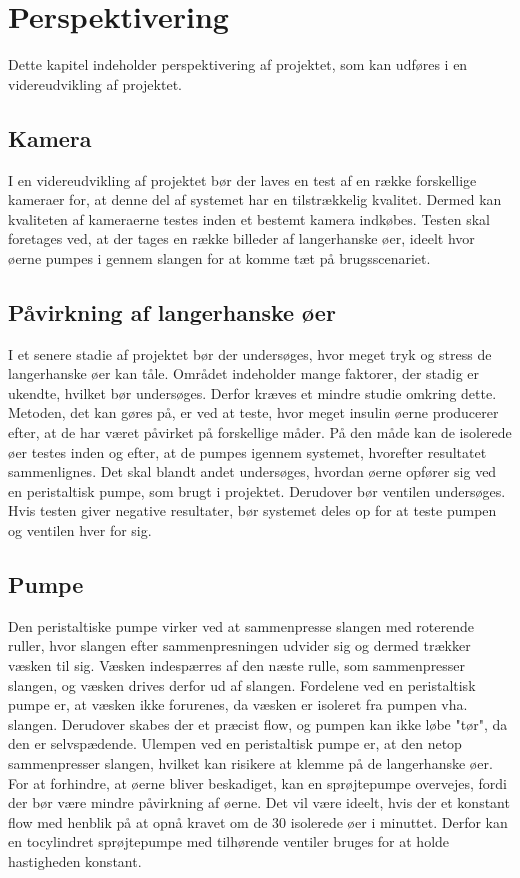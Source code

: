 \chapter{Perspektivering}
Dette kapitel indeholder perspektivering af projektet, som kan udføres i en videreudvikling af projektet.
\section{Kamera}
 I en videreudvikling af projektet bør der laves en test af en række forskellige kameraer for, at denne del af systemet har en tilstrækkelig kvalitet. Dermed kan kvaliteten af kameraerne testes inden et bestemt kamera indkøbes. Testen skal foretages ved, at der tages en række billeder af langerhanske øer, ideelt hvor øerne pumpes i gennem slangen for at komme tæt på brugsscenariet. 

\section{Påvirkning af langerhanske øer}
I et senere stadie af projektet bør der undersøges, hvor meget tryk og stress de langerhanske øer kan tåle. Området indeholder mange faktorer, der stadig er ukendte, hvilket bør undersøges. Derfor kræves et mindre studie omkring dette. Metoden, det kan gøres på, er ved at teste, hvor meget insulin øerne producerer efter, at de har været påvirket på forskellige måder. På den måde kan de isolerede øer testes inden og efter, at de pumpes igennem systemet, hvorefter  resultatet sammenlignes. Det skal blandt andet undersøges, hvordan øerne opfører sig ved en peristaltisk pumpe, som brugt i projektet. Derudover bør ventilen undersøges. Hvis testen giver negative resultater, bør systemet deles op for at teste pumpen og ventilen hver for sig.

\section{Pumpe}
Den peristaltiske pumpe virker ved at sammenpresse slangen med roterende ruller, hvor slangen efter sammenpresningen udvider sig  og dermed trækker væsken til sig. Væsken indespærres af den næste rulle, som sammenpresser slangen, og væsken drives derfor ud af slangen. Fordelene ved en peristaltisk pumpe er, at væsken ikke forurenes, da væsken er isoleret fra pumpen vha. slangen. Derudover skabes der et præcist flow, og pumpen kan ikke løbe "tør", da den er selvspædende. Ulempen ved en peristaltisk pumpe er, at den netop sammenpresser slangen, hvilket kan risikere at klemme på de langerhanske øer. For at forhindre, at øerne bliver beskadiget, kan en sprøjtepumpe overvejes, fordi der bør være mindre påvirkning af øerne. Det vil være ideelt, hvis der et konstant flow med henblik på at opnå kravet om de 30 isolerede øer i minuttet. Derfor kan en tocylindret sprøjtepumpe med tilhørende ventiler bruges for at holde hastigheden konstant. 

